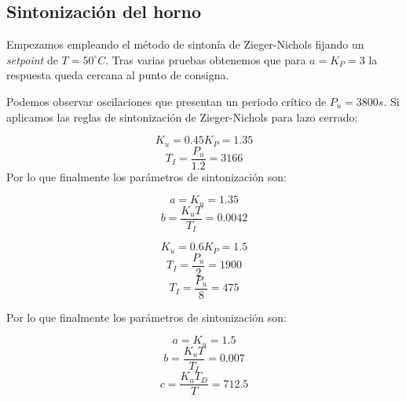 \subsection{Sintonización  del horno}
Empezamos empleando el método de sintonía de Zieger-Nichols fijando un \textit{setpoint} de $T=50^{\circ}C$. Tras varias pruebas obtenemos que para $a=K_{P}=3$ la respuesta queda cercana al punto de consigna.


Podemos observar oscilaciones que presentan un periodo crítico de $P_{u}= 3800s$. Si aplicamos las reglas de sintonización de Zieger-Nichols para lazo cerrado:

$$K_{u}=0.45K_{P}=1.35$$
$$T_{I}=\frac{P_{u}}{1.2}=3166$$
Por lo que finalmente los parámetros de sintonización son:

$$a=K_{u}=1.35$$
$$b=\frac{K_{u}T}{T_{I}}=0.0042$$




$$K_{u}=0.6K_{P}=1.5$$
$$T_{I}=\frac{P_{u}}{2}=1900$$
$$T_{I}=\frac{P_{u}}{8}=475$$

Por lo que finalmente los parámetros de sintonización son:

$$a=K_{u}=1.5$$
$$b=\frac{K_{u}T}{T_{I}}=0.007$$
$$c=\frac{K_{u}T_{D}}{T}=712.5$$

